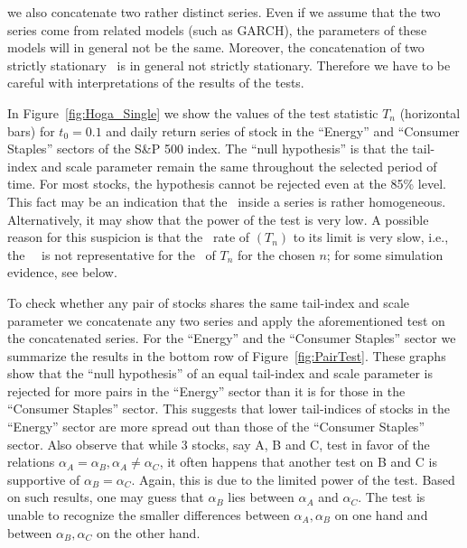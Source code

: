 we also concatenate two rather distinct series. Even if we assume that the two series come from related models
(such as GARCH), the parameters of these models will in general not be the same. Moreover, the concatenation
of two strictly stationary \ts\ is in general not strictly stationary. Therefore we have to be careful
with interpretations of the results of the tests.
\par 
In Figure~\ref{fig:Hoga_Single} we show the values of the test statistic $T_n$ (horizontal bars)
for $t_0=0.1$ and daily return series of stock in the ``Energy'' and ``Consumer Staples'' sectors of the S\&P
500 index. The ``null hypothesis'' is that the tail-index and scale parameter remain the
same throughout the selected period of time. For most stocks, the hypothesis cannot be rejected even at the 85\% level.
This fact may be an indication that the \ds\ inside a series is rather homogeneous.
Alternatively, it may show that the power of the test is very low. A possible reason for this suspicion is that the \con\ rate
of $(T_n)$ to its limit is very slow, i.e., the \asy\ \ds\ is not representative for the \ds\ of $T_n$ for the chosen $n$; for some
simulation evidence, see below.
\par
To check whether any pair of stocks shares the same tail-index and scale parameter we concatenate
any two series and apply the aforementioned test on the concatenated series. For the ``Energy'' and the
``Consumer Staples'' sector we summarize the results in the bottom row of Figure~\ref{fig:PairTest}.
These graphs show that the ``null
hypothesis'' of an equal tail-index and scale parameter is rejected for more pairs in the
``Energy'' sector than it is for those in the ``Consumer Staples''
sector. This suggests that lower tail-indices of stocks in the
``Energy'' sector are more spread out than those of the ``Consumer
Staples'' sector. Also observe that while 3 stocks, say A, B and C, test in favor of
the relations $\alpha_A = \alpha_B, \alpha_A \neq \alpha_C$, it often
happens that another test on B and C is supportive of $\alpha_B = \alpha_C$. Again,
this is due to the limited power of the test. Based
on such results, one may guess that $\alpha_B$ lies between $\alpha_A$ and
$\alpha_C$. The test is unable to recognize the smaller differences
between $\alpha_A, \alpha_B$ on one hand and between $\alpha_B, \alpha_C$ on the other hand.
